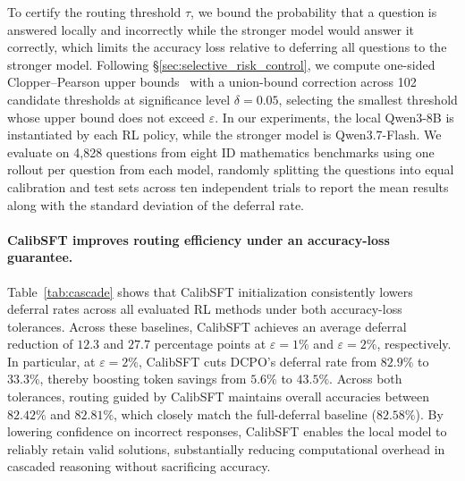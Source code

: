 \documentclass{article} %
\begin{document}
To certify the routing threshold $\tau$, 
we bound the probability that a question is answered locally and incorrectly while the stronger model would answer it correctly, 
which limits the accuracy loss relative to deferring all questions to the stronger model.
Following \S\ref{sec:selective_risk_control}, we compute one-sided Clopper--Pearson upper bounds~\citep{clopper1934use} with a union-bound correction across 102 candidate thresholds at significance level $\delta=0.05$, selecting the smallest threshold whose upper bound does not exceed $\varepsilon$.
In our experiments, the local Qwen3-8B is instantiated by each RL policy, while the stronger model is Qwen3.7-Flash.
We evaluate on 4{,}828 questions from eight ID mathematics benchmarks using one rollout per question from each model, randomly splitting the questions into equal calibration and test sets across ten independent trials to report the mean results along with the standard deviation of the deferral rate.


\paragraph{CalibSFT improves routing efficiency under an accuracy-loss guarantee.}
Table~\ref{tab:cascade} shows that CalibSFT initialization consistently lowers deferral rates across all evaluated RL methods under both accuracy-loss tolerances.
Across these baselines, CalibSFT achieves an average deferral reduction of $12.3$ and $27.7$ percentage points at $\varepsilon=1\%$ and $\varepsilon=2\%$, respectively.
In particular, at $\varepsilon=2\%$, CalibSFT cuts DCPO's deferral rate from $82.9\%$ to $33.3\%$, thereby boosting token savings from $5.6\%$ to $43.5\%$.
Across both tolerances, routing guided by CalibSFT maintains overall accuracies between $82.42\%$ and $82.81\%$, which closely match the full-deferral baseline ($82.58\%$).
By lowering confidence on incorrect responses, CalibSFT enables the local model to reliably retain valid solutions, substantially reducing computational overhead in cascaded reasoning without sacrificing accuracy.
\end{document}
